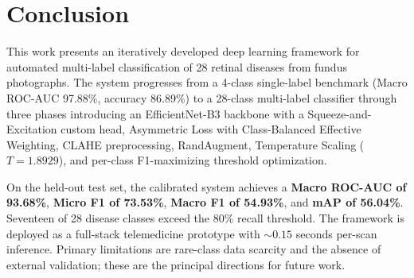 \documentclass[conference]{IEEEtran}
\begin{document}
\section{Conclusion}
This work presents an iteratively developed deep learning framework for automated multi-label classification of 28 retinal diseases from fundus photographs. The system progresses from a 4-class single-label benchmark (Macro ROC-AUC 97.88\%, accuracy 86.89\%) to a 28-class multi-label classifier through three phases introducing an EfficientNet-B3 backbone with a Squeeze-and-Excitation custom head, Asymmetric Loss with Class-Balanced Effective Weighting, CLAHE preprocessing, RandAugment, Temperature Scaling ($T{=}1.8929$), and per-class F1-maximizing threshold optimization.

On the held-out test set, the calibrated system achieves a \textbf{Macro ROC-AUC of 93.68\%}, \textbf{Micro F1 of 73.53\%}, \textbf{Macro F1 of 54.93\%}, and \textbf{mAP of 56.04\%}. Seventeen of 28 disease classes exceed the 80\% recall threshold. The framework is deployed as a full-stack telemedicine prototype with ${\sim}0.15$ seconds per-scan inference. Primary limitations are rare-class data scarcity and the absence of external validation; these are the principal directions for future work.



\end{document}
